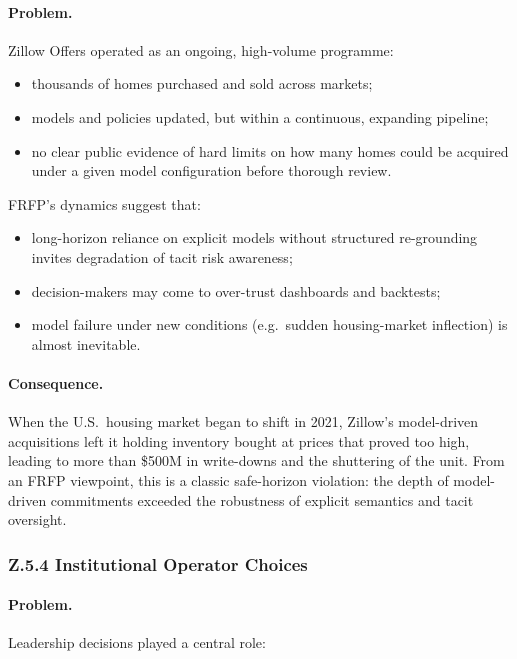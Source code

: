 \paragraph{Problem.}
Zillow Offers operated as an ongoing, high-volume programme:

\begin{itemize}
  \item thousands of homes purchased and sold across markets;
  \item models and policies updated, but within a continuous, expanding
        pipeline;
  \item no clear public evidence of hard limits on how many homes could be
        acquired under a given model configuration before thorough review.
\end{itemize}

FRFP’s dynamics suggest that:

\begin{itemize}
  \item long-horizon reliance on explicit models without structured
        re-grounding invites degradation of tacit risk awareness;
  \item decision-makers may come to over-trust dashboards and backtests;
  \item model failure under new conditions (e.g.\ sudden housing-market
        inflection) is almost inevitable.
\end{itemize}

\paragraph{Consequence.}
When the U.S.\ housing market began to shift in 2021, Zillow’s model-driven
acquisitions left it holding inventory bought at prices that proved too high,
leading to more than \$500M in write-downs and the shuttering of the unit.
From an FRFP viewpoint, this is a classic safe-horizon violation:
the depth of model-driven commitments exceeded the robustness of explicit
semantics and tacit oversight.

\subsubsection*{Z.5.4 Institutional Operator Choices}

\paragraph{Problem.}
Leadership decisions played a central role:

